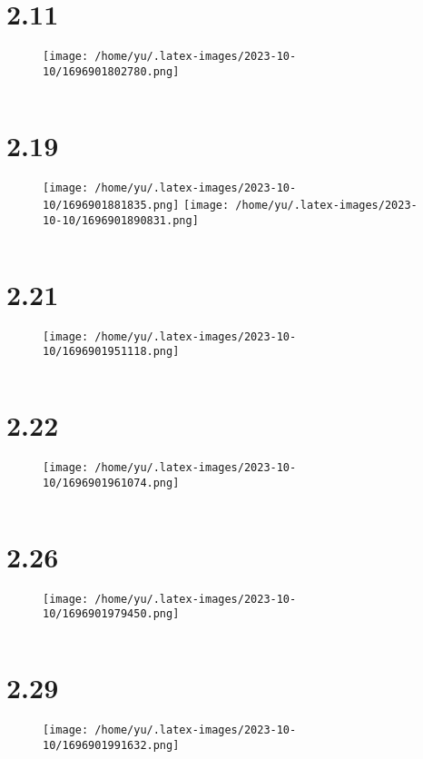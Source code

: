 \documentclass[12pt]{article}
\begin{document}
\vspace*{0pt}
\section*{2.11}

\begin{figure}[H]
    \centering
    \texttt{[image: /home/yu/.latex-images/2023-10-10/1696901802780.png]}
\end{figure}

\inputminted{cpp}{2.11.cpp}



\section*{2.19}

\begin{figure}[H]
    \centering
    \texttt{[image: /home/yu/.latex-images/2023-10-10/1696901881835.png]}
    \texttt{[image: /home/yu/.latex-images/2023-10-10/1696901890831.png]}
\end{figure}

\inputminted{cpp}{2.19.cpp}


\section*{2.21}
\begin{figure}[H]
    \centering
    \texttt{[image: /home/yu/.latex-images/2023-10-10/1696901951118.png]}
\end{figure}

\inputminted{cpp}{2.21.cpp}


\section*{2.22}
\begin{figure}[H]
    \centering
    \texttt{[image: /home/yu/.latex-images/2023-10-10/1696901961074.png]}
\end{figure}

\inputminted{cpp}{2.22.cpp}



\section*{2.26}
\begin{figure}[H]
    \centering
    \texttt{[image: /home/yu/.latex-images/2023-10-10/1696901979450.png]}
\end{figure}

\inputminted{cpp}{2.26.cpp}



\section*{2.29}
\begin{figure}[H]
    \centering
    \texttt{[image: /home/yu/.latex-images/2023-10-10/1696901991632.png]}
\end{figure}

\inputminted{cpp}{2.29.cpp}
\end{document}
